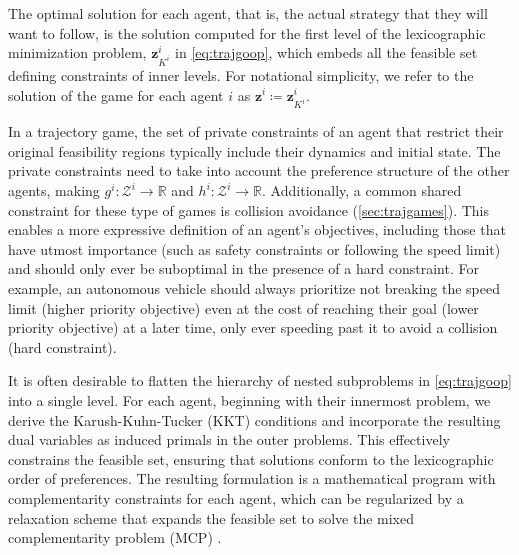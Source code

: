 \vspace{2.5em}\noindent

The optimal solution for each agent,
that is, the actual strategy that they will want to follow,
is the solution computed for the first level 
of the lexicographic minimization problem, \(\mathbf{z}_{K^i}^i\) in \cref{eq:trajgoop},
which embeds all the feasible set defining constraints
of inner levels.
For notational simplicity, we refer
to the solution
of the game
for each agent \(i\)
as \(\mathbf{z}^i \coloneq \mathbf{z}_{K^i}^i\).

In a trajectory game, the set of private constraints of an agent that restrict
their original feasibility regions typically include their dynamics and initial state.
The private constraints need to take into account the
preference structure of the other agents, making
\(g^i \colon \mathcal{Z}^{i} \to \mathbb{R}\)
and \(h^i \colon \mathcal{Z}^{i} \to \mathbb{R}\).
Additionally, a common shared constraint for these type of games
is collision avoidance (\cref{sec:trajgames}).
This enables
a more expressive definition of an agent's objectives, including those
that have utmost importance (such as safety constraints or following the speed limit)
and should only ever be suboptimal in the presence of a hard constraint.
For example, an autonomous vehicle should always prioritize not breaking
the speed limit (higher priority objective) even at the cost
of reaching their goal (lower priority objective) at a later time,
only ever speeding past it to avoid a collision (hard constraint).

It is often desirable to flatten the hierarchy of nested subproblems in \cref{eq:trajgoop} into a single level. For each agent, beginning with their innermost problem, we derive the Karush-Kuhn-Tucker (KKT) conditions and incorporate the resulting dual variables as induced primals in the outer problems. This effectively constrains the feasible set, ensuring that solutions conform to the lexicographic order of preferences. The resulting formulation is a mathematical program with complementarity constraints for each agent, which can be regularized by a relaxation scheme that expands the feasible set to solve the mixed complementarity problem (MCP) \cite{lee:2025}.
